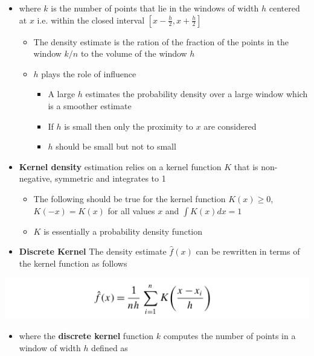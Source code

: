 \documentclass[11pt]{article}
\begin{document}
\begin{itemize}
\item where \(k\) is the number of points that lie in the windows of width \(h\) centered at \(x\) i.e. within the closed interval \([x- \frac h2, x+ \frac h 2]\) 
\begin{itemize}
\item The density estimate is the ration of the fraction of the points in the window \(k/n\) to the volume of the window \(h\)
\item \(h\) plays the role of influence
\begin{itemize}
\item A large \(h\) estimates the probability density over a large window which is a smoother estimate
\item If \(h\) is small then only the proximity to \(x\) are considered
\item \(h\) should be small but not to small
\end{itemize}
\end{itemize}

\item \textbf{Kernel density} estimation relies on a kernel function \(K\) that is non-negative, symmetric and integrates to 1
\begin{itemize}
\item The following should be true for the kernel function \(K(x) \geq 0\), \(K(-x) = K(x)\) for all values \(x\) and \(\int K(x) dx = 1\)
\item \(K\) is essentially a probability density function
\end{itemize}

\item \textbf{Discrete Kernel} The density estimate \(\hat f(x)\) can be rewritten in terms of the kernel function as follows
\end{itemize}
\begin{center}
\includegraphics[width=.9\linewidth]{Density-based Clustering/screenshot_2018-12-01_12-23-48.png}
\end{center}
\begin{itemize}
\item where the \textbf{discrete kernel} function \(k\) computes the number of points in a window of width \(h\) defined as
\end{itemize}
\end{document}
